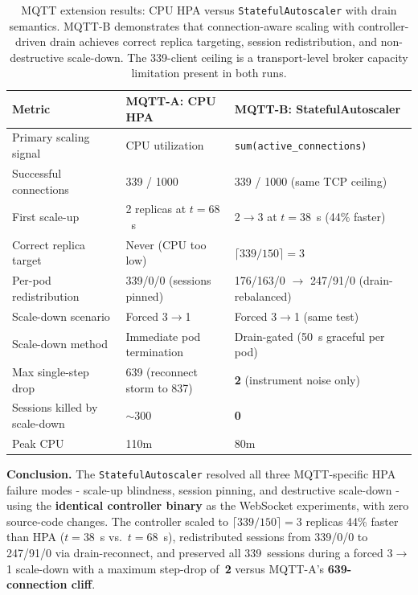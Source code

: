 \documentclass[twocolumn]{svjour3}
\begin{document}
\begin{table}[t]
\centering
\caption{MQTT extension results: CPU HPA versus \texttt{StatefulAutoscaler} with drain semantics. MQTT-B demonstrates that connection-aware scaling with controller-driven drain achieves correct replica targeting, session redistribution, and non-destructive scale-down. The 339-client ceiling is a transport-level broker capacity limitation present in both runs.}
\label{tab:mqtt_results}
\begin{tabular}{@{}p{4.2cm}p{4.8cm}p{4.8cm}@{}}
\toprule
\rowcolor{gray!12}
\textbf{Metric} & \textbf{MQTT-A: CPU HPA} & \textbf{MQTT-B: StatefulAutoscaler} \\
\midrule
Primary scaling signal & CPU utilization & \texttt{sum(active\_connections)} \\
Successful connections & 339 / 1000 & 339 / 1000 (same TCP ceiling) \\
First scale-up & 2 replicas at $t=68$~s & 2$\rightarrow$3 at $t=38$~s (44\% faster) \\
Correct replica target & Never (CPU too low) & $\lceil 339/150 \rceil = 3$ \\
Per-pod redistribution & 339/0/0 (sessions pinned) & 176/163/0 $\rightarrow$ 247/91/0 (drain-rebalanced) \\
Scale-down scenario & Forced 3$\rightarrow$1 & Forced 3$\rightarrow$1 (same test) \\
Scale-down method & Immediate pod termination & Drain-gated (50~s graceful per pod) \\
Max single-step drop & 639 (reconnect storm to 837) & \textbf{2} (instrument noise only) \\
Sessions killed by scale-down & $\sim$300 & \textbf{0} \\
Peak CPU & 110m & 80m \\
\bottomrule
\end{tabular}
\end{table}

\begin{keyresult}
\noindent\textbf{Conclusion.} The \texttt{StatefulAutoscaler} resolved all three MQTT-specific HPA failure modes - scale-up blindness, session pinning, and destructive scale-down - using the \textbf{identical controller binary} as the WebSocket experiments, with zero source-code changes. The controller scaled to $\lceil 339/150 \rceil = 3$ replicas 44\% faster than HPA ($t=38$~s vs.\ $t=68$~s), redistributed sessions from 339/0/0 to 247/91/0 via drain-reconnect, and preserved all 339~sessions during a forced 3$\rightarrow$1 scale-down with a maximum step-drop of~\textbf{2} versus MQTT-A's \textbf{639-connection cliff}.
\end{keyresult}
\end{document}
